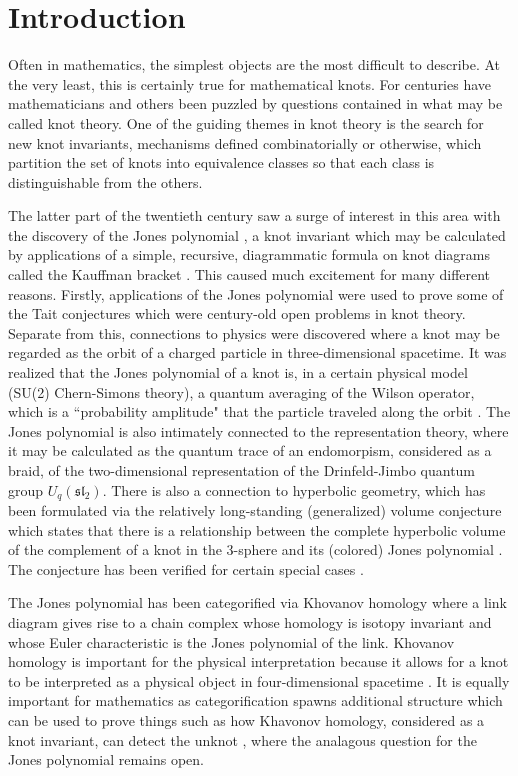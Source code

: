 \chapter{Introduction}

Often in mathematics, the simplest objects are the most difficult to describe. At the very least, this is certainly true for mathematical knots. For centuries have mathematicians and others been puzzled by questions contained in what may be called knot theory. One of the guiding themes in knot theory is the search for new knot invariants, mechanisms defined combinatorially or otherwise, which partition the set of knots into equivalence classes so that each class is distinguishable from the others. 

The latter part of the twentieth century saw a surge of interest in this area with the discovery of the Jones polynomial \cite{Jon85}, a knot invariant which may be calculated by applications of a simple, recursive, diagrammatic formula on knot diagrams called the Kauffman bracket \cite{Kau87}. This caused much excitement for many different reasons. Firstly, applications of the Jones polynomial were used to prove some of the Tait conjectures \cite{Kau87, Thi88} which were century-old open problems in knot theory. Separate from this, connections to physics were discovered where a knot may be regarded as the orbit of a charged particle in three-dimensional spacetime. It was realized that the Jones polynomial of a knot is, in a certain physical model (SU(2) Chern-Simons theory), a quantum averaging of the Wilson operator, which is a ``probability amplitude" that the particle traveled along the orbit \cite{Wit89}. The Jones polynomial is also intimately connected to the representation theory, where it may be calculated as the quantum trace of an endomorpism, considered as a braid, of the two-dimensional representation of the Drinfeld-Jimbo quantum group $U_q(\mathfrak{sl}_2)$. There is also a connection to hyperbolic geometry, which has been formulated via the relatively long-standing (generalized) volume conjecture which states that there is a relationship between the complete hyperbolic volume of the complement of a knot in the $3$-sphere and its (colored) Jones polynomial \cite{Hik07}. The conjecture has been verified for certain special cases \cite{KT00}. 

The Jones polynomial has been categorified via Khovanov homology \cite{Kho00} where a link diagram gives rise to a chain complex whose homology is isotopy invariant and whose Euler characteristic is the Jones polynomial of the link. Khovanov homology is important for the physical interpretation because it allows for a knot to be interpreted as a physical object in four-dimensional spacetime \cite{Wit12}. It is equally important for mathematics as categorification spawns additional structure which can be used to prove things such as how Khavonov homology, considered as a knot invariant, can detect the unknot \cite{KM11}, where the analagous question for the Jones polynomial remains open.

